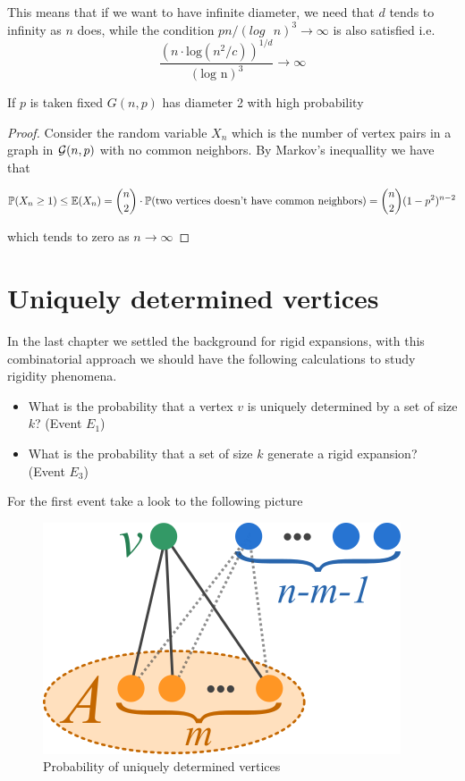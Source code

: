 This means that if we want to have infinite diameter, we need that $d$ tends to infinity as $n$ does, while the condition $pn/(log\text{ }n)^{3} \to \infty$ is also satisfied i.e.
$$ \frac{(n\cdot\text{log}(n^{2}/c))^{1/d}}{(\text{log n})^{3}} \to \infty$$

  

\begin{theorem}
If $p$ is taken fixed $G(n,p)$ has diameter 2 with high probability 
\end{theorem}

\begin{proof}
Consider the random variable $X_{n}$ which is the number of vertex pairs in a graph in $\mathcal{G}(n,p)$ with no common neighbors. By Markov's inequallity we have that

$$\mathbb{P}(X_{n} \geq 1)\leq \mathbb{E}(X_{n}) = \binom{n}{2} \cdot \mathbb{P}(\text{two vertices doesn't have common neighbors}) = \binom{n}{2} (1-p^{2})^{n-2}$$

which tends to zero as $n\to \infty$
\end{proof}



\section{Uniquely determined vertices}

In the last chapter we settled the background for rigid expansions, with this combinatorial approach we should have the following calculations to study rigidity phenomena.

\begin{itemize}
\item What is the probability that a vertex $v$ is uniquely determined by a set of size $k$? (Event $E_1$)
\item What is the probability that a set of size $k$ generate a rigid expansion? (Event $E_3$)
\end{itemize}

For the first event take a look to the following picture

\begin{figure}[h!]
	\centering
	\includegraphics[scale=0.8]{Figures/uni.png}
	\caption{Probability of uniquely determined vertices}
\end{figure}


